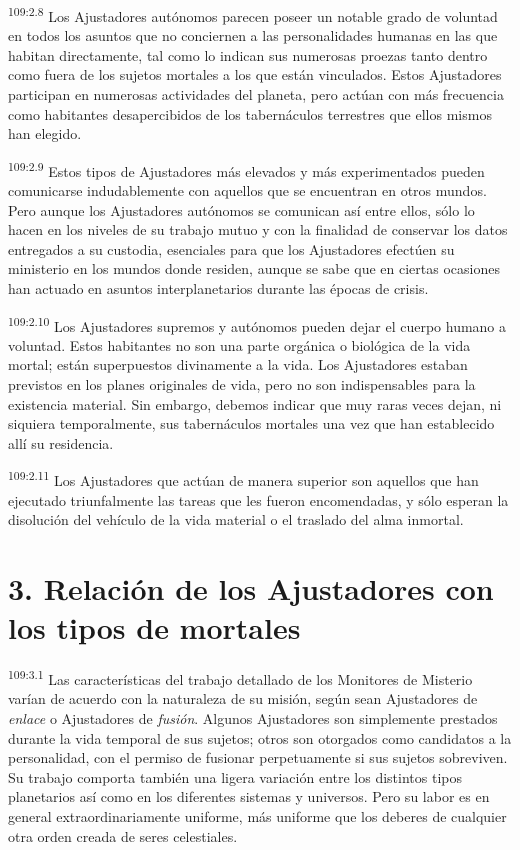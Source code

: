 \documentclass[twoside, 11pt]{book}
\begin{document}
\par
\textsuperscript{109:2.8} Los Ajustadores autónomos parecen poseer un notable grado de voluntad en todos los asuntos que no conciernen a las personalidades humanas en las que habitan directamente, tal como lo indican sus numerosas proezas tanto dentro como fuera de los sujetos mortales a los que están vinculados. Estos Ajustadores participan en numerosas actividades del planeta, pero actúan con más frecuencia como habitantes desapercibidos de los tabernáculos terrestres que ellos mismos han elegido.

\par
\textsuperscript{109:2.9} Estos tipos de Ajustadores más elevados y más experimentados pueden comunicarse indudablemente con aquellos que se encuentran en otros mundos. Pero aunque los Ajustadores autónomos se comunican así entre ellos, sólo lo hacen en los niveles de su trabajo mutuo y con la finalidad de conservar los datos entregados a su custodia, esenciales para que los Ajustadores efectúen su ministerio en los mundos donde residen, aunque se sabe que en ciertas ocasiones han actuado en asuntos interplanetarios durante las épocas de crisis.

\par
\textsuperscript{109:2.10} Los Ajustadores supremos y autónomos pueden dejar el cuerpo humano a voluntad. Estos habitantes no son una parte orgánica o biológica de la vida mortal; están superpuestos divinamente a la vida. Los Ajustadores estaban previstos en los planes originales de vida, pero no son indispensables para la existencia material. Sin embargo, debemos indicar que muy raras veces dejan, ni siquiera temporalmente, sus tabernáculos mortales una vez que han establecido allí su residencia.

\par
\textsuperscript{109:2.11} Los Ajustadores que actúan de manera superior son aquellos que han ejecutado triunfalmente las tareas que les fueron encomendadas, y sólo esperan la disolución del vehículo de la vida material o el traslado del alma inmortal.

\section*{3. Relación de los Ajustadores con los tipos de mortales}
\par
\textsuperscript{109:3.1} Las características del trabajo detallado de los Monitores de Misterio varían de acuerdo con la naturaleza de su misión, según sean Ajustadores de \textit{enlace} o Ajustadores de \textit{fusión}. Algunos Ajustadores son simplemente prestados durante la vida temporal de sus sujetos; otros son otorgados como candidatos a la personalidad, con el permiso de fusionar perpetuamente si sus sujetos sobreviven. Su trabajo comporta también una ligera variación entre los distintos tipos planetarios así como en los diferentes sistemas y universos. Pero su labor es en general extraordinariamente uniforme, más uniforme que los deberes de cualquier otra orden creada de seres celestiales.
\end{document}
